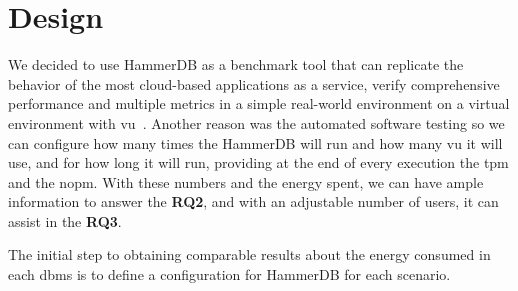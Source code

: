 \section{Design}
\label{sc:Design}



We decided to use HammerDB as a benchmark tool that can replicate the behavior of the most cloud-based applications as a service, verify comprehensive performance and multiple metrics in a simple real-world environment on a virtual environment with \gls{vu}~\cite{hammerdb}. Another reason was the automated software testing \cite{hammerdb} so we can configure how many times the HammerDB will run and how many \gls{vu} it will use, and for how long it will run, providing at the end of every execution the \gls{tpm} and the \gls{nopm}. With these numbers and the energy spent, we can have ample information to answer the \textbf{RQ2}, and with an adjustable number of users, it can assist in the \textbf{RQ3}.



 
 The initial step to obtaining comparable results about the energy consumed in each \gls{dbms} is to define a configuration for HammerDB for each scenario. 
 
 



